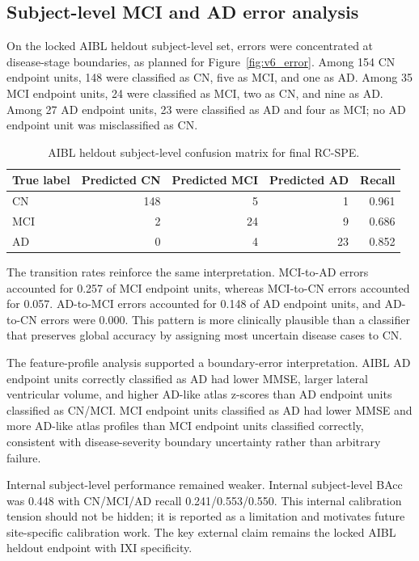 \subsection{Subject-level MCI and AD error analysis}
\label{sec:error_results}

On the locked AIBL heldout subject-level set, errors were concentrated at disease-stage boundaries, as planned for Figure~\ref{fig:v6_error}. Among 154 CN endpoint units, 148 were classified as CN, five as MCI, and one as AD. Among 35 MCI endpoint units, 24 were classified as MCI, two as CN, and nine as AD. Among 27 AD endpoint units, 23 were classified as AD and four as MCI; no AD endpoint unit was misclassified as CN.

\begin{table}[t]
\centering
\caption{AIBL heldout subject-level confusion matrix for final RC-SPE.}
\label{tab:v6_confusion}
\begin{tabular}{@{}lrrrr@{}}
\toprule
True label & Predicted CN & Predicted MCI & Predicted AD & Recall \\
\midrule
CN & 148 & 5 & 1 & 0.961 \\
MCI & 2 & 24 & 9 & 0.686 \\
AD & 0 & 4 & 23 & 0.852 \\
\bottomrule
\end{tabular}
\end{table}

The transition rates reinforce the same interpretation. MCI-to-AD errors accounted for 0.257 of MCI endpoint units, whereas MCI-to-CN errors accounted for 0.057. AD-to-MCI errors accounted for 0.148 of AD endpoint units, and AD-to-CN errors were 0.000. This pattern is more clinically plausible than a classifier that preserves global accuracy by assigning most uncertain disease cases to CN.

The feature-profile analysis supported a boundary-error interpretation. AIBL AD endpoint units correctly classified as AD had lower MMSE, larger lateral ventricular volume, and higher AD-like atlas z-scores than AD endpoint units classified as CN/MCI. MCI endpoint units classified as AD had lower MMSE and more AD-like atlas profiles than MCI endpoint units classified correctly, consistent with disease-severity boundary uncertainty rather than arbitrary failure.

Internal subject-level performance remained weaker. Internal subject-level BAcc was 0.448 with CN/MCI/AD recall 0.241/0.553/0.550. This internal calibration tension should not be hidden; it is reported as a limitation and motivates future site-specific calibration work. The key external claim remains the locked AIBL heldout endpoint with IXI specificity.

